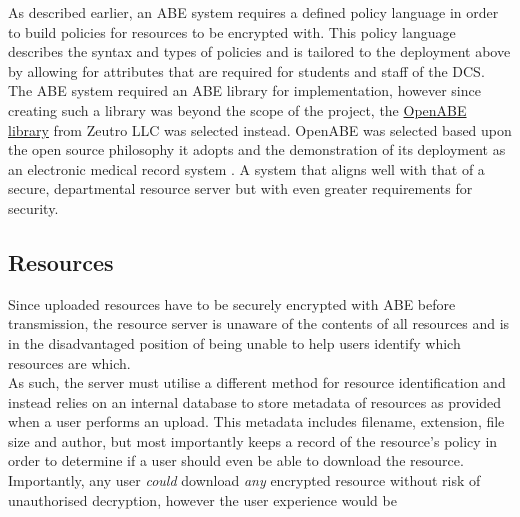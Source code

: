 As described earlier, an ABE system requires a defined policy language in order to build policies for resources to be encrypted with. This policy language describes the syntax and types of policies and is tailored to the deployment above by allowing for attributes that are required for students and staff of the DCS.\\
The ABE system required an ABE library for implementation, however since creating such a library was beyond the scope of the project, the \href{https://github.com/zeutro/openabe}{OpenABE library} from Zeutro LLC was selected instead. OpenABE was selected based upon the open source philosophy it adopts and the demonstration of its deployment as an electronic medical record system \cite{Akinyele2011}. A system that aligns well with that of a secure, departmental resource server but with even greater requirements for security.

\subsection{Resources}

Since uploaded resources have to be securely encrypted with ABE before transmission, the resource server is unaware of the contents of all resources and is in the disadvantaged position of being unable to help users identify which resources are which.\\
As such, the server must utilise a different method for resource identification and instead relies on an internal database to store metadata of resources as provided when a user performs an upload. This metadata includes filename, extension, file size and author, but most importantly keeps a record of the resource's policy in order to determine if a user should even be able to download the resource.\\
Importantly, any user \textit{could} download \textit{any} encrypted resource without risk of unauthorised decryption, however the user experience would be
